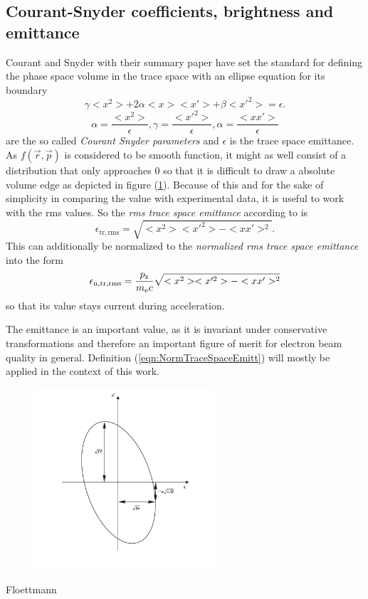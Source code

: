 \subsection{Courant-Snyder coefficients, brightness and emittance}
Courant and Snyder with their summary paper \cite{COURANT1958} have set the standard for defining the phase space volume in the trace space with an ellipse equation for its boundary
\begin{equation}
\label{eqn:CourandSnyderEllipse}
\gamma <x^2>+2\alpha <x> <x'>+\beta <x'^2> =\epsilon.
\end{equation}
\begin{equation}
\alpha =\frac{<x^2>}{\epsilon}, \gamma=\frac{<x'^2>}{\epsilon}, \alpha=\frac{<xx'>}{\epsilon}
\end{equation}
are the so called \textit{Courant Snyder parameters} and $\epsilon$ is the trace space emittance. 
As $f(\vec{r},\vec{p})$ is considered to be smooth function, it might as well consist of a distribution that only approaches 0 so that it is difficult to draw a absolute volume edge as depicted in figure (\ref{img:TraceSpace}).
Because of this and for the sake of simplicity in comparing the value with experimental data, it is useful to work with the rms values. So the \textit{rms trace space emittance} according to \cite{PhysRevSTAB.6.034202} is
\begin{equation}
\epsilon_\mathrm{tr,rms}=\sqrt{<x^2><x'^2>-<xx'>^2}.
\end{equation}
This can additionally be normalized to the \textit{normalized rms trace space emittance} into the form
\begin{equation}
\label{eqn:NormTraceSpaceEmitt}
\epsilon_\mathrm{n,tr,rms}=\frac{p_\mathrm{z}}{m_\mathrm{e} c}\sqrt{<x^2><x'^2>-<xx'>^2}
\end{equation} 
so that its value stays current during acceleration.
 
The emittance is an important value, as it is invariant under conservative transformations and therefore an important 
figure of merit for electron beam quality in general. 
Definition (\ref{eqn:NormTraceSpaceEmitt}) will mostly be applied in the context of this work.

\begin{figure}
\label{img:TraceSpace}
\begin{center}
\includegraphics[width=0.6\textwidth]{theory/images/edited/TraceSpaceCourantSnyder.pdf}
\end{center}
\end{figure}
Floettmann 
